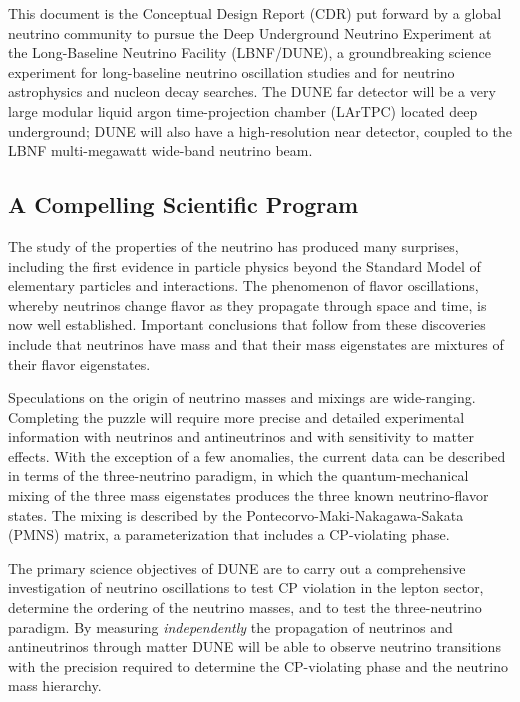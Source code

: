 This document is %
the Conceptual Design Report (CDR) put forward by a global neutrino community to pursue 
the Deep Underground Neutrino Experiment at the Long-Baseline Neutrino Facility (LBNF/DUNE),
a groundbreaking science experiment for long-baseline neutrino oscillation studies and for neutrino astrophysics and nucleon decay searches. The DUNE far detector will be a very large modular liquid argon time-projection chamber (LArTPC) located deep underground; DUNE will also have a high-resolution near detector, coupled to the LBNF multi-megawatt  %
wide-band neutrino beam. 

\subsection{A Compelling Scientific Program}

The study of the properties of the neutrino has produced %
many surprises, including the first evidence in particle physics beyond the Standard Model of elementary particles and interactions.   The phenomenon of flavor oscillations, whereby neutrinos change flavor as they propagate through space and time, is now well established. Important conclusions that follow from these discoveries include that neutrinos have mass and that their %
mass eigenstates are mixtures of their %
flavor eigenstates.

Speculations on the origin of neutrino masses and mixings are wide-ranging. 
Completing the puzzle will require more precise and detailed experimental information with neutrinos and antineutrinos and with sensitivity to matter effects. With the exception of a few anomalies, the current data can be described in terms of the three-neutrino paradigm, in which the 
quantum-mechanical mixing of the three mass eigenstates produces the three known neutrino-flavor states.  The mixing is described by the Pontecorvo-Maki-Nakagawa-Sakata (PMNS) matrix, a parameterization that includes a CP-violating phase. 

The primary science objectives %
of DUNE are to carry out a comprehensive investigation of neutrino oscillations to test CP violation in the lepton sector, determine the ordering of the neutrino masses, and to test the three-neutrino paradigm.
By measuring \textit{independently} the  propagation of neutrinos and antineutrinos through matter DUNE will be able to observe %
neutrino transitions with the precision required to determine the 
CP-violating phase and %
the neutrino mass hierarchy.

